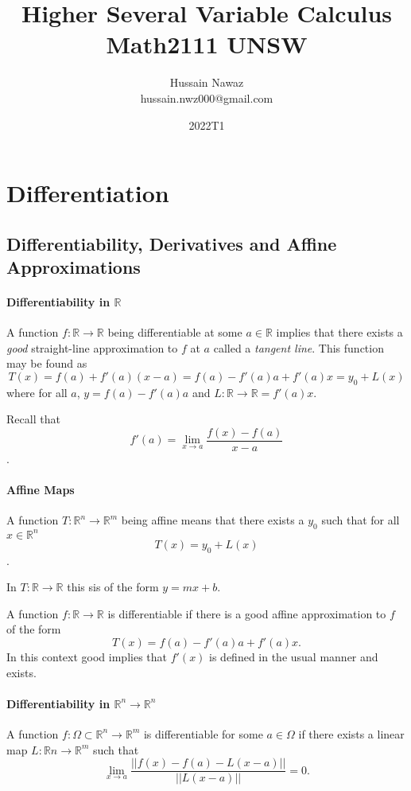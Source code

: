 \documentclass[12pt, letterpaper]{article}
\title{Higher Several Variable Calculus \\ Math2111 UNSW}
\author{Hussain Nawaz \\ hussain.nwz000@gmail.com}
\date{2022T1}
\begin{document}
    \section{Differentiation}

    \subsection{Differentiability, Derivatives and Affine Approximations}

    \paragraph{Differentiability in \(\mathbb{R}\)}
    A function \(f: \mathbb{R}\to \mathbb{R}\) being differentiable at some \(a\in \mathbb{R}\)
    implies that there exists a \textit{good} straight-line approximation to \(f\) at \(a\) called a \textit{tangent line}.
    This function may be found as
    \[T(x) = f(a) + f'(a)(x-a) = f(a) -f'(a)a + f'(a)x = y_0 + L(x)\]
    where for all \(a\), \(y= f(a) - f'(a)a\) and \(L: \mathbb{R}\to \mathbb{R} = f'(a)x\).

	Recall that \[f'(a) = \lim_{x\to a} \frac{f(x) - f(a)}{x-a}\].

    \paragraph{Affine Maps}
    A function \(T: \mathbb{R}^n \to \mathbb{R}^m\) being affine means that there exists
    a \(y_0\) such that for all \(x\in \mathbb{R}^n\)
    \[T(x) = y_0 + L(x)\].

    In \(T: \mathbb{R}\to \mathbb{R}\) this sis of the form \(y = mx+b\).

    A function \(f: \mathbb{R}\to \mathbb{R}\) is differentiable if there is 
    a good affine approximation to \(f\) of the form
    \[T(x) = f(a) - f'(a)a + f'(a)x.\]
    In this context good implies that \(f'(x)\) is defined in the usual manner
    and exists.

    \paragraph{Differentiability in \(\mathbb{R}^n\to \mathbb{R}^n\)}
    
    A function \(f: \Omega\subset \mathbb{R}^n \to \mathbb{R}^m\) is differentiable for some
    \(a\in\mathbb{\Omega}\) if there exists a linear map \(L: \mathbb{R}n\to \mathbb{R}^m\)
    such that
    \[
    \lim_{x\to a} \frac{
        \left|\left|f(x) - f(a) -L(x-a)\right|\right|
    } {
        \left|\left|L(x-a)\right|\right|
    } = 0.
    \]
\end{document}
